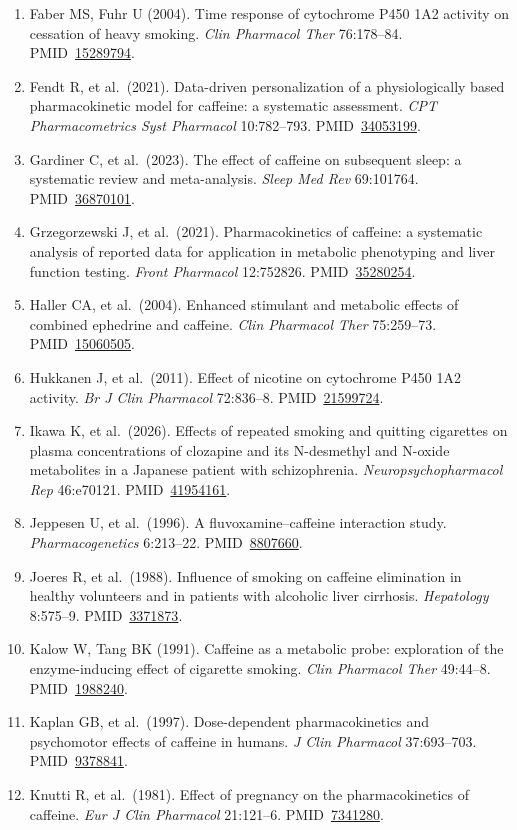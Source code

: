 \documentclass[10pt,a4paper]{article}
\newcommand{\pmid}[1]{PMID~\href{https://pubmed.ncbi.nlm.nih.gov/#1/}{#1}}
\begin{document}
\begin{enumerate}[leftmargin=*,label={}]
\item Faber MS, Fuhr U (2004). Time response of cytochrome P450 1A2 activity on cessation of heavy smoking. \emph{Clin Pharmacol Ther} 76:178--84. \pmid{15289794}.
\item Fendt R, et al.\ (2021). Data-driven personalization of a physiologically based pharmacokinetic model for caffeine: a systematic assessment. \emph{CPT Pharmacometrics Syst Pharmacol} 10:782--793. \pmid{34053199}.
\item Gardiner C, et al.\ (2023). The effect of caffeine on subsequent sleep: a systematic review and meta-analysis. \emph{Sleep Med Rev} 69:101764. \pmid{36870101}.
\item Grzegorzewski J, et al.\ (2021). Pharmacokinetics of caffeine: a systematic analysis of reported data for application in metabolic phenotyping and liver function testing. \emph{Front Pharmacol} 12:752826. \pmid{35280254}.
\item Haller CA, et al.\ (2004). Enhanced stimulant and metabolic effects of combined ephedrine and caffeine. \emph{Clin Pharmacol Ther} 75:259--73. \pmid{15060505}.
\item Hukkanen J, et al.\ (2011). Effect of nicotine on cytochrome P450 1A2 activity. \emph{Br J Clin Pharmacol} 72:836--8. \pmid{21599724}.
\item Ikawa K, et al.\ (2026). Effects of repeated smoking and quitting cigarettes on plasma concentrations of clozapine and its N-desmethyl and N-oxide metabolites in a Japanese patient with schizophrenia. \emph{Neuropsychopharmacol Rep} 46:e70121. \pmid{41954161}.
\item Jeppesen U, et al.\ (1996). A fluvoxamine--caffeine interaction study. \emph{Pharmacogenetics} 6:213--22. \pmid{8807660}.
\item Joeres R, et al.\ (1988). Influence of smoking on caffeine elimination in healthy volunteers and in patients with alcoholic liver cirrhosis. \emph{Hepatology} 8:575--9. \pmid{3371873}.
\item Kalow W, Tang BK (1991). Caffeine as a metabolic probe: exploration of the enzyme-inducing effect of cigarette smoking. \emph{Clin Pharmacol Ther} 49:44--8. \pmid{1988240}.
\item Kaplan GB, et al.\ (1997). Dose-dependent pharmacokinetics and psychomotor effects of caffeine in humans. \emph{J Clin Pharmacol} 37:693--703. \pmid{9378841}.
\item Knutti R, et al.\ (1981). Effect of pregnancy on the pharmacokinetics of caffeine. \emph{Eur J Clin Pharmacol} 21:121--6. \pmid{7341280}.

\end{enumerate}
\end{document}
